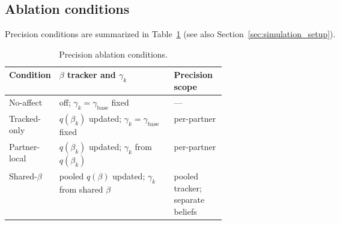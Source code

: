 \subsection{Ablation conditions}

Precision conditions are summarized in Table~\ref{tab:precision_variants} (see also Section~\ref{sec:simulation_setup}).

\begin{table}[H]
\centering
\small
\caption{Precision ablation conditions.}
\label{tab:precision_variants}
\begin{tabularx}{\linewidth}{@{}>{\raggedright\arraybackslash}p{0.18\linewidth}X>{\raggedright\arraybackslash}p{0.24\linewidth}@{}}
\toprule
Condition & $\beta$ tracker and $\gamma_k$ & Precision scope \\
\midrule
No-affect & off; $\gamma_k = \gamma_{\text{base}}$ fixed & --- \\
Tracked-only & $q(\beta_k)$ updated; $\gamma_k = \gamma_{\text{base}}$ fixed & per-partner \\
Partner-local & $q(\beta_k)$ updated; $\gamma_k$ from $q(\beta_k)$ & per-partner \\
Shared-$\beta$ & pooled $q(\beta)$ updated; $\gamma_k$ from shared $\beta$ & pooled tracker; separate beliefs \\
\bottomrule
\end{tabularx}
\end{table}
